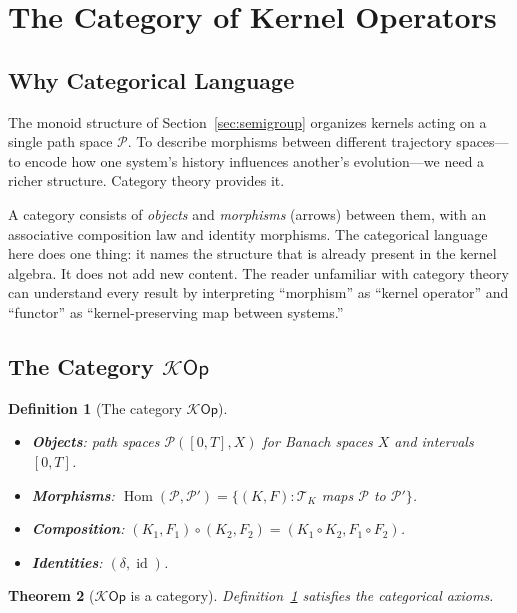\documentclass[12pt]{article}
\newtheorem{theorem}{Theorem}[section]
\newtheorem{definition}[theorem]{Definition}
\DeclareMathOperator{\Hom}{Hom}
\DeclareMathOperator{\id}{id}
\newcommand{\Pcal}{\mathcal{P}}
\newcommand{\Kcal}{\mathcal{K}}
\begin{document}
\section{The Category of Kernel Operators}
\label{sec:cat}

\subsection{Why Categorical Language}

The monoid structure of Section~\ref{sec:semigroup} organizes kernels acting
on a single path space $\Pcal$. To describe morphisms between different
trajectory spaces---to encode how one system's history influences another's
evolution---we need a richer structure. Category theory provides it.

A category consists of \emph{objects} and \emph{morphisms} (arrows) between
them, with an associative composition law and identity morphisms. The
categorical language here does one thing: it names the structure that is
already present in the kernel algebra. It does not add new content. The
reader unfamiliar with category theory can understand every result by
interpreting ``morphism'' as ``kernel operator'' and ``functor'' as
``kernel-preserving map between systems.''

\subsection{The Category \texorpdfstring{$\Kcal\mathsf{Op}$}{KOp}}

\begin{definition}[The category $\Kcal\mathsf{Op}$]
\label{def:kop}
\begin{itemize}
  \item \textbf{Objects}: path spaces $\Pcal([0,T], X)$ for Banach spaces $X$
    and intervals $[0,T]$.
  \item \textbf{Morphisms}: $\Hom(\Pcal, \Pcal') = \{(K, F) :
    \mathcal{T}_K$ maps $\Pcal$ to $\Pcal'\}$.
  \item \textbf{Composition}: $(K_1, F_1)\circ(K_2, F_2) = (K_1\circ K_2,
    F_1 \circ F_2)$.
  \item \textbf{Identities}: $(\delta, \id)$.
\end{itemize}
\end{definition}

\begin{theorem}[$\Kcal\mathsf{Op}$ is a category]
Definition~\ref{def:kop} satisfies the categorical axioms.
\end{theorem}
\end{document}
